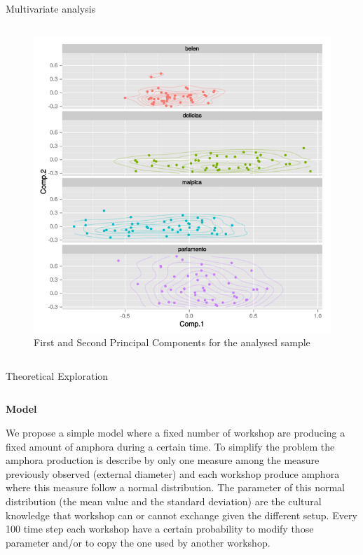 \documentclass[final]{beamer}
\newlength{\onecolwid}
\newlength{\twocolwid}
\begin{document}
\begin{frame}[t]
\begin{columns}[t]
\begin{column}{\twocolwid}
\begin{block}{Multivariate analysis}
\begin{columns}[t,totalwidth=\twocolwid]
\begin{column}{\onecolwid} %


\begin{figure}
\includegraphics[width=0.6\linewidth]{images/fig2.png}
\caption{First and Second Principal Components for the analysed sample}
\end{figure}

\end{column}
\end{columns}

\end{block}

\begin{block}{Theoretical Exploration}

\begin{columns}[t,totalwidth=\twocolwid]

\begin{column}{\onecolwid} %

{\textbf{Model}}\\
\justify

We propose a simple model where a fixed number of workshop are producing a fixed amount of amphora during a certain time. 
To simplify the problem the amphora production is describe by only one measure among the measure previously observed (external diameter) and each workshop produce amphora where this measure follow a normal distribution. The parameter of this normal distribution (the mean value and the standard deviation) are the cultural knowledge that workshop can or cannot exchange given the different setup. Every 100 time step each workshop have a certain probability to modify those parameter and/or to copy the one used by another workshop. 



\end{column}
\end{columns}
\end{block}
\end{column}
\end{columns}
\end{frame}
\end{document}
